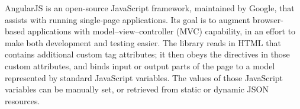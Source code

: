 	AngularJS is an open-source JavaScript framework, maintained by Google, that assists with running single-page applications. Its goal is to augment browser-based applications with model–view–controller (MVC) capability, in an effort to make both development and testing easier.
	The library reads in HTML that contains additional custom tag attributes; it then obeys the directives in those custom attributes, and binds input or output parts of the page to a model represented by standard JavaScript variables. The values of those JavaScript variables can be manually set, or retrieved from static or dynamic JSON resources.\par\cite{alterar}